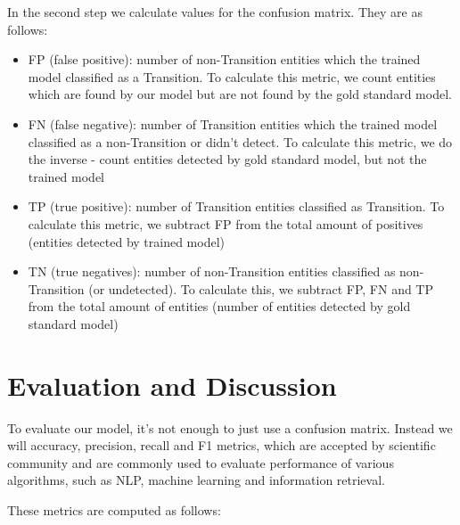 \documentclass[conference]{IEEEtran}
\begin{document}
In the second step we calculate values for the confusion matrix. They are as follows:

\begin{itemize}
    \item FP (false positive): number of non-Transition entities which the trained model classified as a Transition. To calculate this metric, we count entities which are found by our model but are not found by the gold standard model.
    \item FN (false negative): number of Transition entities which the trained model classified as a non-Transition or didn’t detect. To calculate this metric, we do the inverse - count entities detected by gold standard model, but not the trained model
    \item TP (true positive): number of Transition entities classified as Transition. To calculate this metric, we subtract FP from the total amount of positives (entities detected by trained model)
    \item TN (true negatives): number of non-Transition entities classified as non-Transition (or undetected). To calculate this, we subtract FP, FN and TP from the total amount of entities (number of entities detected by gold standard model)
\end{itemize}

\section{Evaluation and Discussion}

To evaluate our model, it's not enough to just use a confusion matrix. Instead we will accuracy, precision, recall and F1 metrics, which are accepted by scientific community and are commonly used to evaluate performance of various algorithms, such as NLP, machine learning and information retrieval. 

These metrics are computed as follows:
\end{document}
